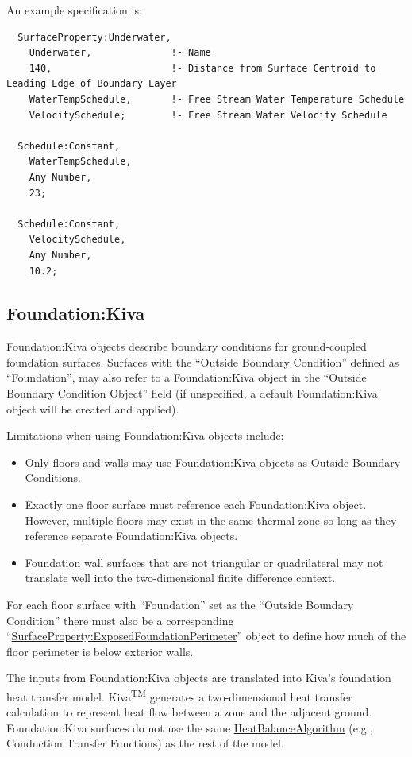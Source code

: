 An example specification is:

\begin{lstlisting}
  SurfaceProperty:Underwater,
    Underwater,              !- Name
    140,                     !- Distance from Surface Centroid to Leading Edge of Boundary Layer
    WaterTempSchedule,       !- Free Stream Water Temperature Schedule
    VelocitySchedule;        !- Free Stream Water Velocity Schedule

  Schedule:Constant,
    WaterTempSchedule,
    Any Number,
    23;

  Schedule:Constant,
    VelocitySchedule,
    Any Number,
    10.2;
\end{lstlisting}

\subsection{Foundation:Kiva}\label{foundationkiva}

Foundation:Kiva objects describe boundary conditions for ground-coupled
foundation surfaces. Surfaces with the ``Outside Boundary Condition''
defined as ``Foundation'', may also refer to a Foundation:Kiva object in
the ``Outside Boundary Condition Object'' field (if unspecified, a
default Foundation:Kiva object will be created and applied).

Limitations when using Foundation:Kiva objects include:

\begin{itemize}
\tightlist
\item
  Only floors and walls may use Foundation:Kiva objects as Outside
  Boundary Conditions.
\item
  Exactly one floor surface must reference each Foundation:Kiva object.
  However, multiple floors may exist in the same thermal zone so long as
  they reference separate Foundation:Kiva objects.
\item
  Foundation wall surfaces that are not triangular or quadrilateral may not
  translate well into the two-dimensional finite difference context.
\end{itemize}

For each floor surface with ``Foundation'' set as the ``Outside Boundary Condition''
there must also be a corresponding ``\hyperref[surfaceproperty-exposedfoundationperimeter]{SurfaceProperty:ExposedFoundationPerimeter}''
object to define how much of the floor perimeter is below exterior walls.

The inputs from Foundation:Kiva objects are translated into Kiva's
foundation heat transfer model. Kiva\textsuperscript{TM} generates a
two-dimensional heat transfer calculation to represent heat flow between
a zone and the adjacent ground. Foundation:Kiva surfaces do not use the
same \hyperref[heatbalancealgorithm]{HeatBalanceAlgorithm} (e.g., Conduction Transfer Functions) as the
rest of the model.

